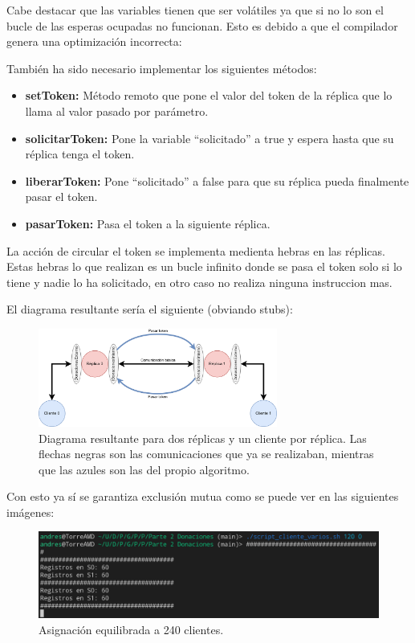 \documentclass{article}
\begin{document}
Cabe destacar que las variables tienen que ser volátiles ya que si no lo son el bucle de las esperas ocupadas no funcionan. Esto es debido a que el compilador genera una optimización incorrecta:



También ha sido necesario implementar los siguientes métodos:

\begin{itemize}
    \item \textbf{setToken: }Método remoto que pone el valor del token de la réplica que lo llama al valor pasado por parámetro.
    \item \textbf{solicitarToken: }Pone la variable ``solicitado'' a true y espera hasta que su réplica tenga el token.
    \item \textbf{liberarToken: }Pone ``solicitado'' a false para que su réplica pueda finalmente pasar el token.
    \item \textbf{pasarToken: }Pasa el token a la siguiente réplica.
\end{itemize}

La acción de circular el token se implementa medienta hebras en las réplicas. Estas hebras lo que realizan es un bucle infinito donde se pasa el token solo si lo tiene y nadie lo ha solicitado, en otro caso no realiza ninguna instruccion mas.

El diagrama resultante sería el siguiente (obviando stubs):

\begin{figure}[H]
    \centering
    \includegraphics[width=0.7\textwidth]{imagenes/diagramaAnillo.png}
    \caption{Diagrama resultante para dos réplicas y un cliente por réplica. Las flechas negras son las comunicaciones que ya se realizaban, mientras que las azules son las del propio algoritmo.}
\end{figure}

Con esto ya sí se garantiza exclusión mutua como se puede ver en las siguientes imágenes:

\begin{figure}[H]
    \centering
    \includegraphics[width=\textwidth]{imagenes/varios/correcto.png}
    \caption{Asignación equilibrada a 240 clientes.}
\end{figure}
\end{document}
